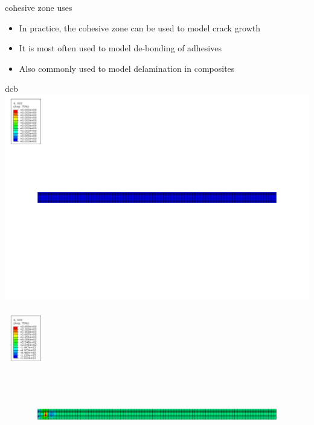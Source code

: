 \documentclass[
  letterpaper,
  ignorenonframetext,
  aspectratio=43,
  handout,
  12pt]{beamer}
\providecommand{\tightlist}{%
  \setlength{\itemsep}{0pt}\setlength{\parskip}{0pt}}
\providecommand{\tightlist}{%
\setlength{\itemsep}{0pt}\setlength{\parskip}{0pt}}
\let\Oldincludegraphics\includegraphics
\renewcommand{\includegraphics}[2][]{\Oldincludegraphics[width=\textwidth,height=0.7\textheight,keepaspectratio]{#2}}
\begin{document}
\begin{frame}{cohesive zone uses}
\protect\hypertarget{cohesive-zone-uses}{}
\begin{itemize}
\tightlist
\item
  In practice, the cohesive zone can be used to model crack growth
\item
  It is most often used to model de-bonding of adhesives
\item
  Also commonly used to model delamination in composites
\end{itemize}
\end{frame}

\begin{frame}{dcb}
\protect\hypertarget{dcb}{}
\includegraphics{../images/dcb1.png}

\includegraphics{../images/dcb2.png}


\end{frame}
\end{document}
